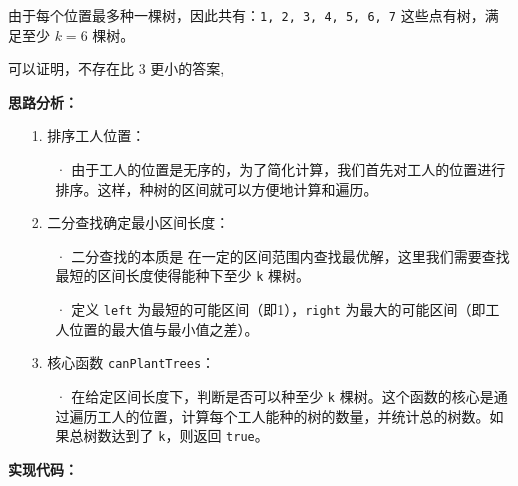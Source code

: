 \documentclass[a4paper]{ctexart}
\begin{document}
由于每个位置最多种一棵树，因此共有：\texttt{1, 2, 3, 4, 5, 6, 7} 这些点有树，满足至少 $k = 6$ 棵树。

可以证明，不存在比 3 更小的答案,

	
\vspace{10pt}
	
\noindent\textbf{思路分析：}
\begin{itemize}
\item[1.] 排序工人位置：
\begin{itemize}
	\item[·] 由于工人的位置是无序的，为了简化计算，我们首先对工人的位置进行排序。这样，种树的区间就可以方便地计算和遍历。
\end{itemize}

\item[2.] 二分查找确定最小区间长度：
\begin{itemize}
	\item[·] 二分查找的本质是 在一定的区间范围内查找最优解，这里我们需要查找最短的区间长度使得能种下至少 \texttt{k} 棵树。
	\item[·] 定义 \texttt{left} 为最短的可能区间（即1），\texttt{right} 为最大的可能区间（即工人位置的最大值与最小值之差）。
\end{itemize}

\item[3.] 核心函数 \texttt{canPlantTrees}：
\begin{itemize}
	\item[·] 在给定区间长度下，判断是否可以种至少 \texttt{k} 棵树。这个函数的核心是通过遍历工人的位置，计算每个工人能种的树的数量，并统计总的树数。如果总树数达到了 \texttt{k}，则返回 \texttt{true}。
\end{itemize}


\end{itemize}
	
\noindent\textbf{实现代码：}
	
\end{document}

